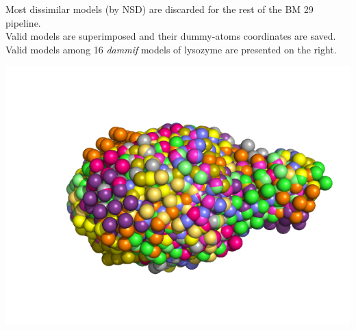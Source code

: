 \documentclass[12pt]{article}
\begin{document}
\vspace{-0.5cm}
\begin{minipage}{0.55\linewidth}
    Most dissimilar models (by NSD) are discarded for the rest of the 
    BM 29 pipeline.\\
    Valid models are superimposed and their dummy-atoms coordinates are 
    saved. 
    Valid models among 16 \textit{dammif} models of lysozyme are 
    presented on the right.
\end{minipage} \hfill
\begin{minipage}{0.4\linewidth}
    \begin{flushleft}
    \includegraphics[scale=0.35]{validmodels.png}
    \end{flushleft}
\end{minipage}


\begin{center}
\end{center}
\end{document}
